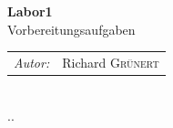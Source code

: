 \documentclass[12pt]{article}
\begin{document}
\begin{titlepage}

{ \huge \bfseries Labor1}\\ %
\vspace{0.034441853748633004\paperheight}
\large Vorbereitungsaufgaben\\
\vspace{0.1458980337503154\paperheight}


  \begin{tabular}{lr}
    \emph{Autor:} & Richard {\color{hsblue}\textsc{Grünert}}
   \end{tabular}\\[0.05572809000084118\paperheight]

{\large {\the\day.\the\month.\the\year}}\\




\vfill %

\end{titlepage}
\end{document}
